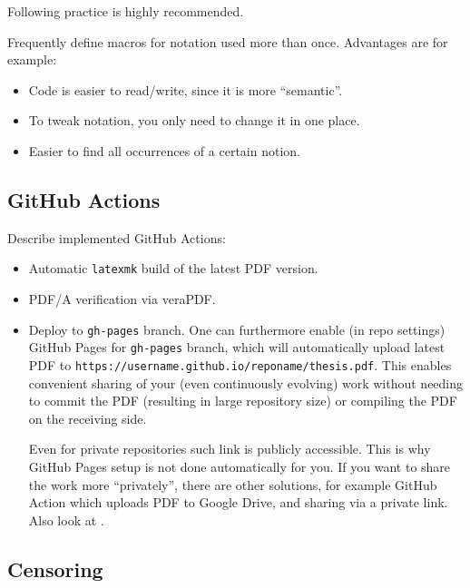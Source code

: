\vspace{1ex}
Following practice is highly recommended.
\begin{tip}
    Frequently define macros for notation used more than once. Advantages are for example:
    \begin{itemize}
        \item Code is easier to read/write, since it is more \enquote{semantic}.
        \item To tweak notation, you only need to change it in one place.
        \item Easier to find all occurrences of a certain notion. \qedhere
    \end{itemize}
\end{tip}

\subsection{GitHub Actions}%
\label{sub:GitHub Actions}

Describe implemented \textsf{GitHub Actions}:
\begin{itemize}
    \item Automatic \texttt{latexmk} build of the latest PDF version.
    \item PDF/A verification via \textsf{veraPDF}.
    \item Deploy to \texttt{gh-pages} branch.
          One can furthermore enable (in repo settings) \textsf{GitHub Pages} for \texttt{gh-pages} branch, which will automatically upload latest PDF to \texttt{https://username.github.io/reponame/thesis.pdf}.
          This enables convenient sharing of your (even continuously evolving) work without needing to commit the PDF (resulting in large repository size) or compiling the PDF on the receiving side.
          \begin{remark}
              Even for private repositories such link is publicly accessible.
              This is why \textsf{GitHub Pages} setup is not done automatically for you.
              If you want to share the work more \enquote{privately}, there are other solutions, for example \textsf{GitHub Action} which uploads PDF to \textsf{Google Drive}, and sharing via a private link.
              Also look at .
          \end{remark}
\end{itemize}

\subsection{Censoring}%
\label{sub:Censoring}

